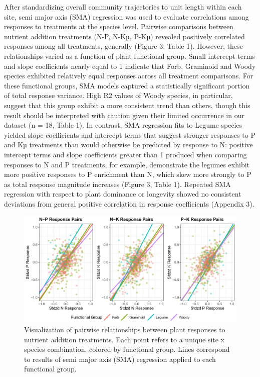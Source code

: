 \documentclass[twoside,12pt,final]{ucthesis-CA2012}
\begin{document}
\begin{ucmainmatter}
After standardizing overall community trajectories to unit length within each site, semi major axis (SMA) regression was used to evaluate correlations among responses to treatments at the species level. Pairwise comparisons between nutrient addition treatments (N-P, N-Kµ, P-Kµ) revealed positively correlated responses among all treatments, generally (Figure 3, Table 1). However, these relationships varied as a function of plant functional group. Small intercept terms and slope coefficients nearly equal to 1 indicate that Forb, Graminoid and Woody species exhibited relatively equal responses across all treatment comparisons. For these functional groups, SMA models captured a statistically significant portion of total response variance. High R2 values of Woody species, in particular, suggest that this group exhibit a more consistent trend than others, though this result should be interpreted with caution given their limited occurrence in our dataset (n = 18, Table 1).
In contrast, SMA regression fits to Legume species yielded slope coefficients and intercept terms that suggest stronger responses to P and Kµ treatments than would otherwise be predicted by response to N: positive intercept terms and slope coefficients greater than 1 produced when comparing responses to N and P treatments, for example, demonstrate the legumes exhibit more positive responses to P enrichment than N, which skew more strongly to P as total response magnitude increases (Figure 3, Table 1).
Repeated SMA regression with respect to plant dominance or longevity showed no consistent deviations from general positive correlation in response coefficients (Appendix 3).
\begin{figure}
\centering
\includegraphics[width=\textwidth,height=0.35\textheight]{figure/Fig1_3.png}
\caption{Visualization of pairwise relationships between plant responses to nutrient addition treatments. Each point refers to a unique site x species combination, colored by functional group. Lines correspond to results of semi major axis (SMA) regression applied to each functional group. \label{fig-1-3}}

\end{figure}
\end{ucmainmatter}
\end{document}
